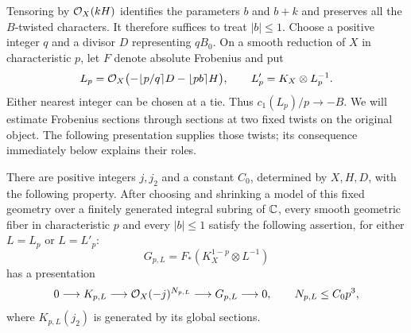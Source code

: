 Tensoring by $\mathcal O_X(kH)$ identifies the parameters $b$ and $b+k$
and preserves all the $B$-twisted characters.  It therefore suffices
to treat $|b|\leq1$.  Choose a positive integer $q$ and a divisor $D$
representing $qB_0$.  On a smooth reduction of $X$ in characteristic
$p$, let $F$ denote absolute Frobenius and put
\begin{equation}\label{eq:rounding-lines}
 L_p=\mathcal O_X\bigl(-\lfloor p/q\rceil D-\lfloor pb\rceil H\bigr),
 \qquad L'_p=K_X\otimes L_p^{-1}.
\end{equation}
Either nearest integer can be chosen at a tie.  Thus
$c_1(L_p)/p\longrightarrow-B$.
We will estimate Frobenius sections through sections at two fixed
twists on the original object.  The following presentation supplies
those twists; its consequence immediately below explains their roles.

\begin{lemma}\label{lem:frobenius-presentation}
There are positive integers $j,j_2$ and a constant $C_0$, determined
by $X,H,D$, with the following property.  After choosing and shrinking
a model of this fixed geometry over a finitely generated integral
subring of $\mathbb C$, every smooth geometric fiber in characteristic $p$
and every $|b|\leq1$ satisfy the following assertion, for either
$L=L_p$ or $L=L'_p$:
\[
 G_{p,L}=F_*(K_X^{1-p}\otimes L^{-1})
\]
has a presentation
\begin{equation}\label{eq:frobenius-presentation}
 0\longrightarrow K_{p,L}\longrightarrow\mathcal O_X(-j)^{N_{p,L}}
 \longrightarrow G_{p,L}\longrightarrow0,
 \qquad N_{p,L}\leq C_0p^3,
\end{equation}
where $K_{p,L}(j_2)$ is generated by its global sections.
\end{lemma}

